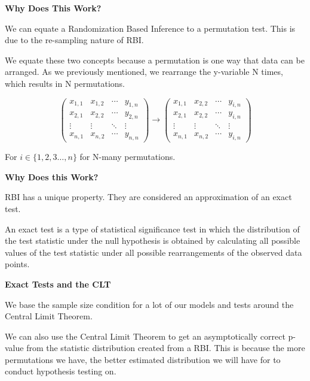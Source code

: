 \documentclass{beamer}
\begin{document}
\begin{frame}{\textbf{Why Does This Work?}}

    We can equate a Randomization Based Inference to a permutation test. This is due to the re-sampling nature of RBI.
    
    \newline\quad
    
    We equate these two concepts because a permutation is one way that data can be arranged. As we previously mentioned, we rearrange the y-variable N times, which results in N permutations. 
    
    $$
        \begin{pmatrix}
            x_{1,1} & x_{1,2} & \cdots & y_{1,n} \\
            x_{2,1} & x_{2,2} & \cdots & y_{2,n} \\
            \vdots  & \vdots  & \ddots & \vdots  \\
            x_{n,1} & x_{n,2} & \cdots & y_{n,n} 
        \end{pmatrix}\longrightarrow
        \begin{pmatrix}
            x_{1,1} & x_{2,2} & \cdots & y_{i,n} \\
            x_{2,1} & x_{2,2} & \cdots & y_{i,n} \\
            \vdots  & \vdots  & \ddots & \vdots  \\
            x_{n,1} & x_{n,2} & \cdots & y_{i,n} 
        \end{pmatrix} 
    $$
    \begin{center}
        For $i\in \{1,2,3\dots,n\}$ for N-many permutations.
    \end{center}
\end{frame}

\begin{frame}{\textbf{Why Does this Work?}}

    RBI has a unique property. They are considered an approximation of an exact test. 
    
    \newline\quad
    
    An exact test is a type of statistical significance test in which the distribution of the test statistic under the null hypothesis is obtained by calculating all possible values of the test statistic under all possible rearrangements of the observed data points.
    
\end{frame}

\begin{frame}{\textbf{Exact Tests and the CLT}}

    We base the sample size condition for a lot of our models and tests around the Central Limit Theorem. 
    
    \newline\quad
    
    We can also use the Central Limit Theorem to get an asymptotically correct p-value from the statistic distribution created from a RBI. This is because the more permutations we have, the better estimated distribution we will have for to conduct hypothesis testing on.
    
\end{frame}
\end{document}
